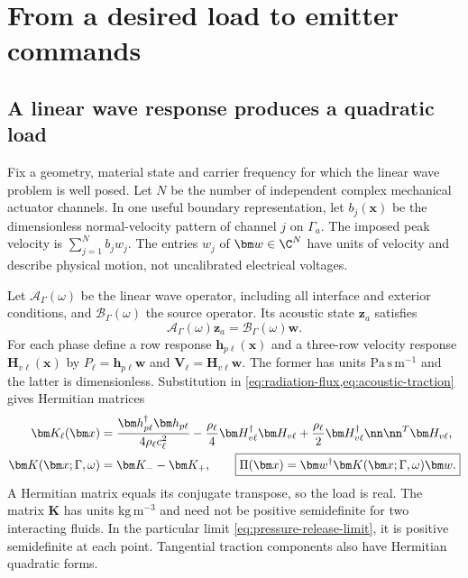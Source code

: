 \section{From a desired load to emitter commands}\label{sec:inverse}

\subsection{A linear wave response produces a quadratic load}
Fix a geometry, material state and carrier frequency for which the linear wave
problem is well posed. Let $N$ be the number of independent complex mechanical
actuator channels. In one useful boundary representation, let $b_j(\bm x)$ be
the dimensionless normal-velocity pattern of channel $j$ on $\Gamma_a$.
The imposed peak velocity is $\sum_{j=1}^N b_jw_j$. The entries $w_j$ of
$\bm w\in\C^N$ have units of velocity and describe physical motion, not
uncalibrated electrical voltages.

Let $\mathcal A_\Gamma(\omega)$ be the linear wave operator, including all
interface and exterior conditions, and $\mathcal B_\Gamma(\omega)$ the source
operator. Its acoustic state $\bm z_a$ satisfies
\begin{equation}
 \mathcal A_\Gamma(\omega)\bm z_a
       =\mathcal B_\Gamma(\omega)\bm w.
 \label{eq:wave-operator}
\end{equation}
For each phase define a row response $\bm h_{p\ell}(\bm x)$ and a three-row
velocity response $\bm H_{v\ell}(\bm x)$ by
$P_\ell=\bm h_{p\ell}\bm w$ and
$\bm V_\ell=\bm H_{v\ell}\bm w$. The former has units
$\mathrm{Pa\,s\,m^{-1}}$ and the latter is dimensionless. Substitution in
\cref{eq:radiation-flux,eq:acoustic-traction} gives Hermitian matrices
\begin{align}
 \bm K_\ell(\bm x)&=
 \frac{\bm h_{p\ell}^\dagger\bm h_{p\ell}}{4\rho_\ell c_\ell^2}
 -\frac{\rho_\ell}{4}\bm H_{v\ell}^\dagger\bm H_{v\ell}
 +\frac{\rho_\ell}{2}\bm H_{v\ell}^\dagger\nn\nn^T\bm H_{v\ell},\\
 \bm K(\bm x;\Gamma,\omega)&=\bm K_- -\bm K_+,\qquad
 \boxed{\Pi(\bm x)=\bm w^\dagger\bm K(\bm x;\Gamma,\omega)\bm w.}
 \label{eq:quadratic-load}
\end{align}
A Hermitian matrix equals its conjugate transpose, so the load is real.
The matrix $\bm K$ has units $\mathrm{kg\,m^{-3}}$ and need not be positive
semidefinite for two interacting fluids. In the particular limit
\cref{eq:pressure-release-limit}, it is positive semidefinite at each point.
Tangential traction components also have Hermitian quadratic forms.

